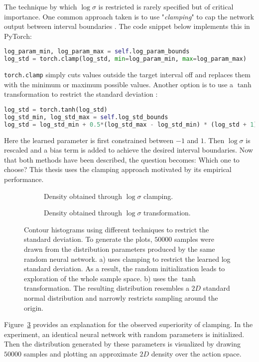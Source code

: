 The technique by which $\log \sigma$ is restricted is rarely specified but of critical importance. One common approach taken is to use "\emph{clamping}" to cap the network output between interval boundaries \cite{raffinStableBaselines32019}. The code snippet below implements this in PyTorch:
\begin{lstlisting}[language=Python, deletekeywords={sum}]
log_param_min, log_param_max = self.log_param_bounds
log_std = torch.clamp(log_std, min=log_param_min, max=log_param_max)
\end{lstlisting}
\texttt{torch.clamp} simply cuts values outside the target interval off and replaces them with the minimum or maximum possible values. Another option is to use a $\tanh$ transformation to restrict the standard deviation \cite{yaratsSoftActorcriticSAC2020}:
\begin{lstlisting}[language=Python, deletekeywords={sum}]
log_std = torch.tanh(log_std)
log_std_min, log_std_max = self.log_std_bounds
log_std = log_std_min + 0.5*(log_std_max - log_std_min) * (log_std + 1)
\end{lstlisting}
Here the learned parameter is first constrained between $-1$ and $1$. Then $\log \sigma$ is rescaled and a bias term is added to achieve the desired interval boundaries.
Now that both methods have been described, the question becomes: Which one to choose? This thesis uses the clamping approach motivated by its empirical performance.
\begin{figure}
\begin{subfigure}{\textwidth}
  \centering
  \scalebox{0.7}{
  
  }
  \caption{Density obtained through $\log \sigma$ clamping.}
  \label{fig:clamped_maze_density}
\end{subfigure}

\begin{subfigure}{\textwidth}
  \centering
  \scalebox{0.7}{
  
  }
  \caption{Density obtained through $\log \sigma$ transformation.}
  \label{fig:tanh_maze_density}
\end{subfigure}
\caption[Different versions of restricting the policy standard deviation]{Contour histograms using different techniques to restrict the standard deviation. To generate the plots, $50000$ samples were drawn from the distribution parameters produced by the same random neural network. a) uses clamping to restrict the learned log standard deviation. As a result, the random initialization leads to exploration of the whole sample space. b) uses the $\tanh$ transformation. The resulting distribution resembles a $2D$ standard normal distribution and narrowly restricts sampling around the origin.}
\label{fig:tanh_vs_clamped_std}
\end{figure}
Figure~\ref{fig:tanh_vs_clamped_std} provides an explanation for the observed superiority of clamping. In the experiment, an identical neural network with random parameters is initialized. Then the distribution generated by these parameters is visualized by drawing $50000$ samples and plotting an approximate $2D$ density over the action space.


